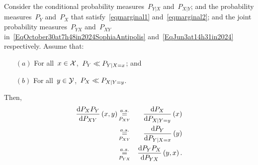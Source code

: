 \documentclass[lettersize,onecolumn]{IEEEtran}
\begin{document}
\begin{theorem}\label{TheoBYR2}
Consider the conditional probability measures~$P_{Y | X}$ and~$P_{X | Y}$;  and the probability measures~$P_{Y}$ 
and~$P_{X}$ that satisfy~\eqref{eqmarginal1} and~\eqref{eqmarginal2}; and the joint probability measures~$P_{YX}$ and~$P_{XY}$ in~\eqref{EqOctober30at7h48in2024SophiaAntipolis} and~\eqref{EqJun3at14h31in2024}  respectively.
 Assume that:
\begin{itemize}
\item[$\left(a\right)$] For all~$x \in \mathcal X$,~${P_{Y}}\ll{P_{Y | X = x}}$; 
and 
\item[$\left(b\right)$] For all~$y \in \mathcal Y$,~${P_{X}}\ll{P_{X | Y = y}}$. 
\end{itemize} 
Then, 
\begin{eqnarray}
 \label{EqInverseOuter1Inner1}
\frac{\mathrm{d} P_{X}P_{Y}}{\mathrm{d} P_{XY}} \left( x,y \right)& \displaystyle\mathop{ \stackrel{a.s.}{=}}_{P_{XY}}& \frac{\mathrm{d} P_{X}}{\mathrm{d} P_{X | Y = y}} \left( x \right)\\
 \label{EqInverseInner1Inner2}
 & \displaystyle\mathop{ \stackrel{a.s.}{=}}_{P_{XY}} & \frac{\mathrm{d} P_{Y}}{\mathrm{d} P_{Y | X = x}}\left( y \right)\\
  \label{EqInverseInner2Outer2}
 & \displaystyle\mathop{ \stackrel{a.s.}{=}}_{P_{YX}}&  \frac{\mathrm{d} P_{Y}P_{X}}{\mathrm{d} P_{YX}}\left( y,x\right).
\end{eqnarray}
\end{theorem}
\end{document}
